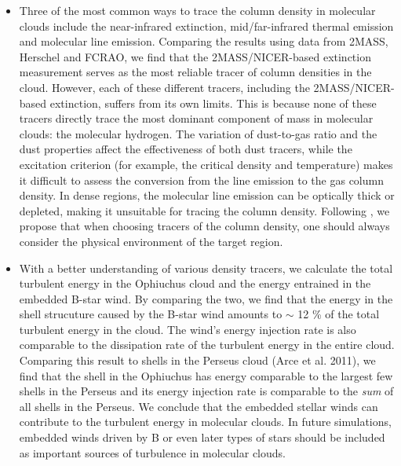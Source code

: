 \documentclass[11pt,a4paper]{emulateapj}
\begin{document}
\begin{itemize}
\item Three of the most common ways to trace the column density in molecular clouds include the near-infrared extinction, mid/far-infrared thermal emission and molecular line emission. Comparing the results using data from 2MASS, Herschel and FCRAO, we find that the 2MASS/NICER-based extinction measurement serves as the most reliable tracer of column densities in the cloud. However, each of these different tracers, including the 2MASS/NICER-based extinction, suffers from its own limits. This is because none of these tracers directly trace the most dominant component of mass in molecular clouds: the molecular hydrogen. The variation of dust-to-gas ratio and the dust properties affect the effectiveness of both dust tracers, while the excitation criterion (for example, the critical density and temperature) makes it difficult to assess the conversion from the line emission to the gas column density. In dense regions, the molecular line emission can be optically thick or depleted, making it unsuitable for tracing the column density. Following \citet{Goodman_2009}, we propose that when choosing tracers of the column density, one should always consider the physical environment of the target region. 
\item With a better understanding of various density tracers, we calculate the total turbulent energy in the Ophiuchus cloud and the energy entrained in the embedded B-star wind. By comparing the two, we find that the energy in the shell strucuture caused by the B-star wind amounts to $\sim$ 12 \% of the total turbulent energy in the cloud. The wind's energy injection rate is also comparable to the dissipation rate of the turbulent energy in the entire cloud. Comparing this result to shells in the Perseus cloud (Arce et al. 2011), we find that the shell in the Ophiuchus has energy comparable to the largest few shells in the Perseus and its energy injection rate is comparable to the \emph{sum} of all shells in the Perseus. We conclude that the embedded stellar winds can contribute to the turbulent energy in molecular clouds. In future simulations, embedded winds driven by B or even later types of stars should be included as important sources of turbulence in molecular clouds.
\end{itemize}



\end{document}

